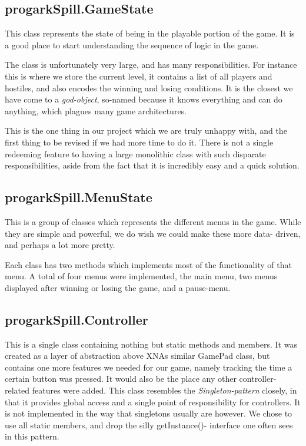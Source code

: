 \subsection{progarkSpill.GameState}
This class represents the state of being in the playable portion of the game. 
It is a good place to start understanding the sequence of logic in the game.

The class is unfortunately very large, and has many responsibilities. For 
instance this is where we store the current level, it contains a list of all
players and hostiles, and also encodes the winning and losing conditions. It is
the closest we have come to a \emph{god-object}, so-named because it knows
everything and can do anything, which plagues many game architectures.

This is the one thing in our project which we are truly unhappy with, and the
first thing to be revised if we had more time to do it. There is not a single
redeeming feature to having a large monolithic class with such disparate
responsibilities, aside from the fact that it is incredibly easy and a quick
solution.

\subsection{progarkSpill.MenuState}
This is a group of classes which represents the different menus in the game.
While they are simple and powerful, we do wish we could make these more data-
driven, and perhaps a lot more pretty.

Each class has two methods which implements most of the functionality of that
menu. A total of four menus were implemented, the main menu, two menus 
displayed  after winning or losing the game, and a pause-menu.

\subsection{progarkSpill.Controller}
This is a single class containing nothing but static methods and members. It
was created as a layer of abstraction above XNAs similar GamePad class, but
contains one more features we needed for our game, namely tracking the time a
certain button was pressed. It would also be the place any other controller-
related features were added. This class resembles the \emph{Singleton-pattern}
closely, in that it provides global access and a single point of responsibility
for controllers. It is not implemented in the way that singletons usually are
however. We chose to use all static members, and drop the silly getInstance()-
interface one often sees in this pattern.

